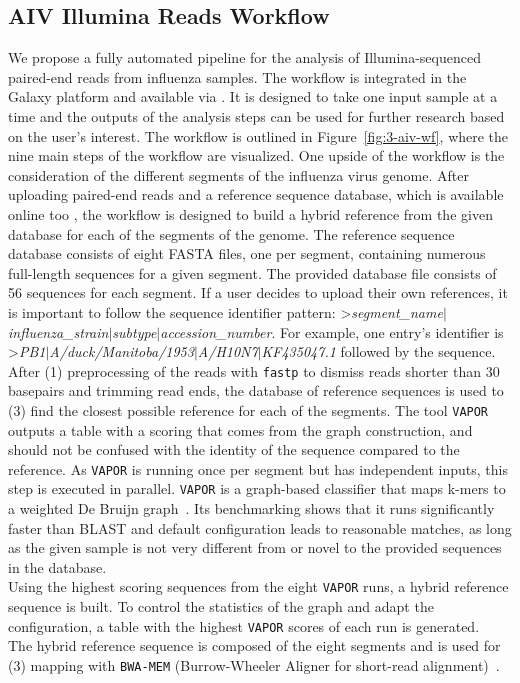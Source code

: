 \subsection{AIV Illumina Reads Workflow}
We propose a fully automated pipeline for the analysis of Illumina-sequenced paired-end reads from influenza samples. The workflow is integrated in the Galaxy platform and available via . It is designed to take one input sample at a time and the outputs of the analysis steps can be used for further research based on the user's interest. The workflow is outlined in Figure~\ref{fig:3-aiv-wf}, where the nine main steps of the workflow are visualized. One upside of the workflow is the consideration of the different segments of the influenza virus genome. After uploading paired-end reads and a reference sequence database, which is available online too , the workflow is designed to build a hybrid reference from the given database for each of the segments of the genome. The reference sequence database consists of eight FASTA files, one per segment, containing numerous full-length sequences for a given segment. The provided database file consists of 56 sequences for each segment. If a user decides to upload their own references, it is important to follow the sequence identifier pattern: >\textit{segment\_name$\mid$influenza\_strain$\mid$subtype$\mid$accession\_number}. For example, one entry's identifier is >\textit{PB1$\mid$A/duck/Manitoba/1953$\mid$A/H10N7$\mid$KF435047.1} followed by the sequence. \\
After (1) preprocessing of the reads with \texttt{fastp} to dismiss reads shorter than 30 basepairs and trimming read ends, the database of reference sequences is used to (3) find the closest possible reference for each of the segments. The tool \texttt{VAPOR} outputs a table with a scoring that comes from the graph construction, and should not be confused with the identity of the sequence compared to the reference. As \texttt{VAPOR} is running once per segment but has independent inputs, this step is executed in parallel. \texttt{VAPOR} is a graph-based classifier that maps k-mers to a weighted De Bruijn graph~\cite{southgate2020influenza}. Its benchmarking shows that it runs significantly faster than BLAST and default configuration leads to reasonable matches, as long as the given sample is not very different from or novel to the provided sequences in the database. \\
Using the highest scoring sequences from the eight \texttt{VAPOR} runs, a hybrid reference sequence is built. To control the statistics of the graph and adapt the configuration, a table with the highest \texttt{VAPOR} scores of each run is generated. \\
The hybrid reference sequence is composed of the eight segments and is used for (3) mapping with \texttt{BWA-MEM} (Burrow-Wheeler Aligner for short-read alignment)~\cite{li2013aligning}. 

